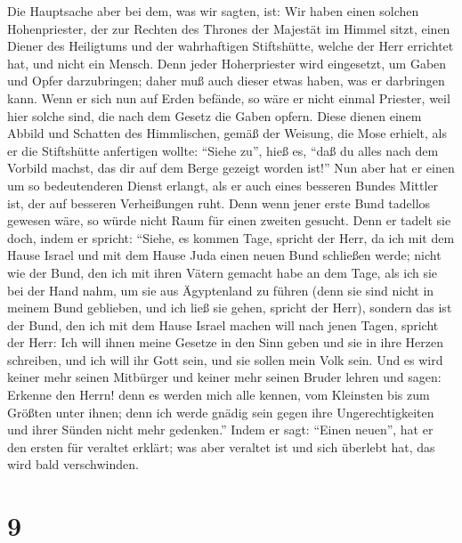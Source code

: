  Die Hauptsache aber bei dem, was wir sagten, ist: Wir
haben einen solchen Hohenpriester, der zur Rechten des Thrones der
Majestät im Himmel sitzt,  einen Diener des Heiligtums und
der wahrhaftigen Stiftshütte, welche der Herr errichtet hat, und nicht
ein Mensch.  Denn jeder Hoherpriester wird eingesetzt, um
Gaben und Opfer darzubringen; daher muß auch dieser etwas haben, was er
darbringen kann.  Wenn er sich nun auf Erden befände, so
wäre er nicht einmal Priester, weil hier solche sind, die nach dem
Gesetz die Gaben opfern.  Diese dienen einem Abbild und
Schatten des Himmlischen, gemäß der Weisung, die Mose erhielt, als er
die Stiftshütte anfertigen wollte: ``Siehe zu'', hieß es, ``daß du alles
nach dem Vorbild machst, das dir auf dem Berge gezeigt worden ist!''
 Nun aber hat er einen um so bedeutenderen Dienst erlangt,
als er auch eines besseren Bundes Mittler ist, der auf besseren
Verheißungen ruht.  Denn wenn jener erste Bund tadellos
gewesen wäre, so würde nicht Raum für einen zweiten gesucht.
 Denn er tadelt sie doch, indem er spricht: ``Siehe, es
kommen Tage, spricht der Herr, da ich mit dem Hause Israel und mit dem
Hause Juda einen neuen Bund schließen werde;  nicht wie
der Bund, den ich mit ihren Vätern gemacht habe an dem Tage, als ich sie
bei der Hand nahm, um sie aus Ägyptenland zu führen (denn sie sind nicht
in meinem Bund geblieben, und ich ließ sie gehen, spricht der Herr),
 sondern das ist der Bund, den ich mit dem Hause Israel
machen will nach jenen Tagen, spricht der Herr: Ich will ihnen meine
Gesetze in den Sinn geben und sie in ihre Herzen schreiben, und ich will
ihr Gott sein, und sie sollen mein Volk sein.  Und es
wird keiner mehr seinen Mitbürger und keiner mehr seinen Bruder lehren
und sagen: Erkenne den Herrn! denn es werden mich alle kennen, vom
Kleinsten bis zum Größten unter ihnen;  denn ich werde
gnädig sein gegen ihre Ungerechtigkeiten und ihrer Sünden nicht mehr
gedenken.''  Indem er sagt: ``Einen neuen'', hat er den
ersten für veraltet erklärt; was aber veraltet ist und sich überlebt
hat, das wird bald verschwinden.

\hypertarget{section-8}{%
\section{9}\label{section-8}}

